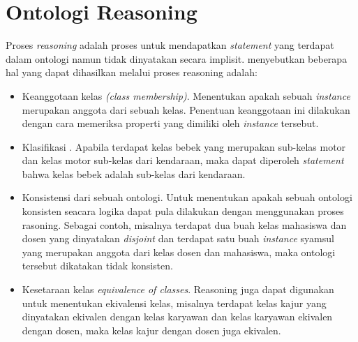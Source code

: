 \section{Ontologi Reasoning}
Proses \emph{reasoning} adalah proses untuk mendapatkan \emph{statement} yang terdapat dalam ontologi namun tidak dinyatakan secara implisit. \citet*{antoniou} menyebutkan beberapa hal yang dapat dihasilkan melalui proses reasoning adalah:
\begin{itemize}
	\item Keanggotaan kelas \emph{(class membership)}. Menentukan apakah sebuah \emph{instance} merupakan anggota dari sebuah kelas. Penentuan keanggotaan ini dilakukan dengan cara memeriksa properti yang dimiliki oleh \emph{instance} tersebut.
	\item Klasifikasi . Apabila terdapat kelas bebek yang merupakan sub-kelas motor dan kelas motor sub-kelas dari kendaraan, maka dapat diperoleh \emph{statement} bahwa kelas bebek adalah sub-kelas dari kendaraan.
	\item Konsistensi dari sebuah ontologi. Untuk menentukan apakah sebuah ontologi konsisten seacara logika dapat pula dilakukan dengan menggunakan proses rasoning. Sebagai contoh, misalnya terdapat dua buah kelas mahasiswa dan dosen yang dinyatakan \emph{disjoint} dan terdapat satu buah \emph{instance} syamsul yang merupakan anggota dari kelas dosen dan mahasiswa, maka ontologi tersebut dikatakan tidak konsisten.
	\item Kesetaraan kelas \emph{equivalence of classes}. Reasoning juga dapat digunakan untuk menentukan ekivalensi kelas, misalnya terdapat kelas kajur yang dinyatakan ekivalen dengan kelas karyawan dan kelas karyawan ekivalen dengan dosen, maka kelas kajur dengan dosen juga ekivalen. 
\end{itemize}